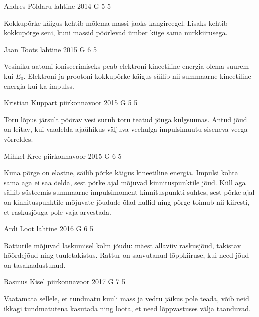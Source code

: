 \documentclass[11pt]{article}
\begin{document}
{%
{Andres Põldaru} %
{lahtine} %
{2014} %
{G 5} %
{5} %
{

\ifHint
Kokkupõrke käigus kehtib mõlema massi jaoks kangireegel. Lisaks kehtib kokkupõrge seni, kuni massid pöörlevad ümber kiige sama nurkkiirusega.
\fi
}

{Jaan Toots} %
{lahtine} %
{2015} %
{G 6} %
{5} %
{

\ifHint
Vesiniku aatomi ioniseerimiseks peab elektroni kineetiline energia olema suurem kui $E_0$. Elektroni ja prootoni kokkupõrke käigus säilib nii summaarne kineetiline energia kui ka impulss.
\fi
}

{Kristian Kuppart} %
{piirkonnavoor} %
{2015} %
{G 5} %
{5} %
{

\ifHint
Toru lõpus järsult pöörav vesi surub toru teatud jõuga külgsuunas. Antud jõud on leitav, kui vaadelda ajaühikus väljuva veehulga impulsimuutu siseneva veega võrreldes.
\fi
}

{Mihkel Kree} %
{piirkonnavoor} %
{2015} %
{G 6} %
{5} %
{

\ifHint
Kuna põrge on elastne, säilib põrke käigus kineetiline energia. Impulsi kohta sama aga ei saa öelda, sest põrke ajal mõjuvad kinnituspunktile jõud. Küll aga säilib süsteemis summaarne impulsimoment kinnituspunkti suhtes, sest põrke ajal on kinnituspunktile mõjuvate jõudude õlad nullid ning põrge toimub nii kiiresti, et raskusjõuga pole vaja arvestada.
\fi
}

{Ardi Loot} %
{lahtine} %
{2016} %
{G 6} %
{5} %
{

\ifHint
Ratturile mõjuvad laskumisel kolm jõudu: mäest allaviiv raskusjõud, takistav hõõrdejõud ning tuuletakistus. Rattur on saavutanud lõppkiiruse, kui need jõud on tasakaalustunud.
\fi
}

{Rasmus Kisel} %
{piirkonnavoor} %
{2017} %
{G 7} %
{5} %
{

\ifHint
Vaatamata sellele, et tundmatu kuuli mass ja vedru jäikus pole teada, võib neid ikkagi tundmatutena kasutada ning loota, et need lõppvastuses välja taanduvad.
\fi
}

}
\end{document}
